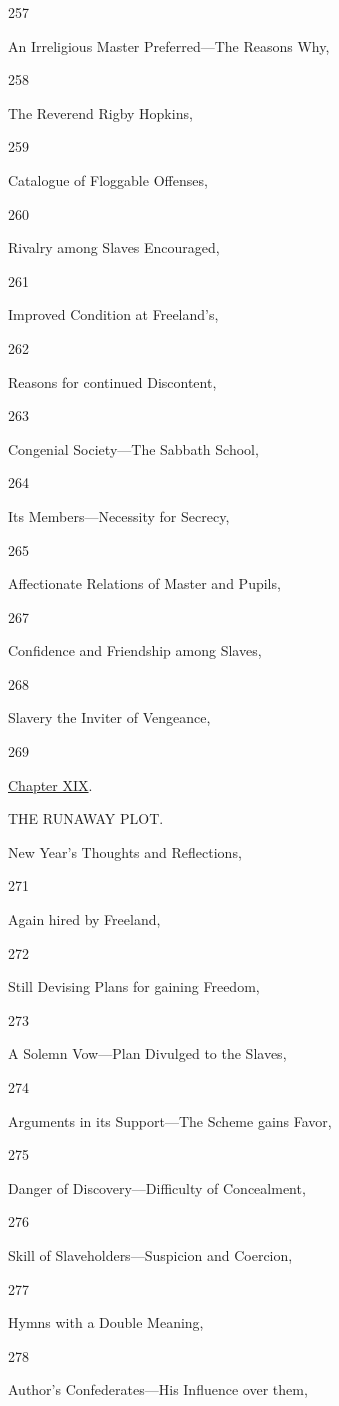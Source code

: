 257

An Irreligious Master Preferred---The Reasons Why,

258

The Reverend Rigby Hopkins,

259

Catalogue of Floggable Offenses,

260

Rivalry among Slaves Encouraged,

261

Improved Condition at Freeland's,

262

Reasons for continued Discontent,

263

Congenial Society---The Sabbath School,

264

Its Members---Necessity for Secrecy,

265

Affectionate Relations of Master and Pupils,

267

Confidence and Friendship among Slaves,

268

Slavery the Inviter of Vengeance,

269

\href{/wiki/My_Bondage_and_My_Freedom_(1855)/Chapter_XIX}{Chapter XIX}.

THE RUNAWAY PLOT.

New Year's Thoughts and Reflections,

271

Again hired by Freeland,

272

Still Devising Plans for gaining Freedom,

273

A Solemn Vow---Plan Divulged to the Slaves,

274

Arguments in its Support---The Scheme gains Favor,

275

Danger of Discovery---Difficulty of Concealment,

276

Skill of Slaveholders---Suspicion and Coercion,

277

Hymns with a Double Meaning,

278

Author's Confederates---His Influence over them,

